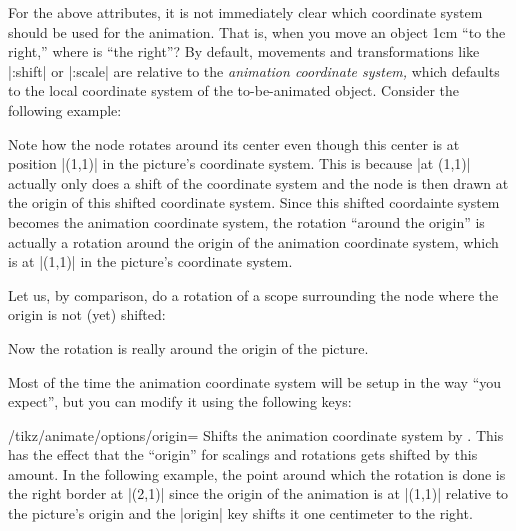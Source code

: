 For the above attributes, it is not immediately clear which coordinate
system should be used for the animation. That is, when you move an
object 1cm ``to the right,'' where is ``the right''? 
By default, movements and transformations like |:shift| or |:scale|
are relative to the \emph{animation coordinate system,} which defaults
to the local coordinate system of the to-be-animated object. Consider
the following example:
\begin{codeexample}[animation list={0.5,1,1.5,2}]
\end{codeexample}
Note how the node rotates around its center even though this center is
at position |(1,1)| in the picture's coordinate system. This is
because |at (1,1)| actually only does a shift of the coordinate system
and the node is then drawn at the origin of this shifted coordinate
system. Since this shifted coordainte system becomes the animation
coordinate system, the rotation ``around the origin'' is actually a
rotation around the origin of the animation coordinate system, which
is at |(1,1)| in the picture's coordinate system.

Let us, by comparison, do a rotation of a scope surrounding the node
where the origin is not (yet) shifted:
\begin{codeexample}[animation list={0.5,1,1.5,2}]
\end{codeexample}
Now the rotation is really around the origin of the picture.

Most of the time the animation coordinate system will be setup in the
way ``you expect'', but you can modify it using the following keys:

\begin{key}{/tikz/animate/options/origin=}
  Shifts the animation coordinate system by . This
  has the effect that the ``origin'' for scalings and rotations gets
  shifted by this amount. In the following example, the point around
  which the rotation is done is the right border at |(2,1)| since the
  origin of the animation is at |(1,1)| relative to the picture's
  origin and the |origin| key shifts it one centimeter to the right.
\begin{codeexample}[animation list={0.5,1,1.5,2}]
\end{codeexample}
\end{key}

